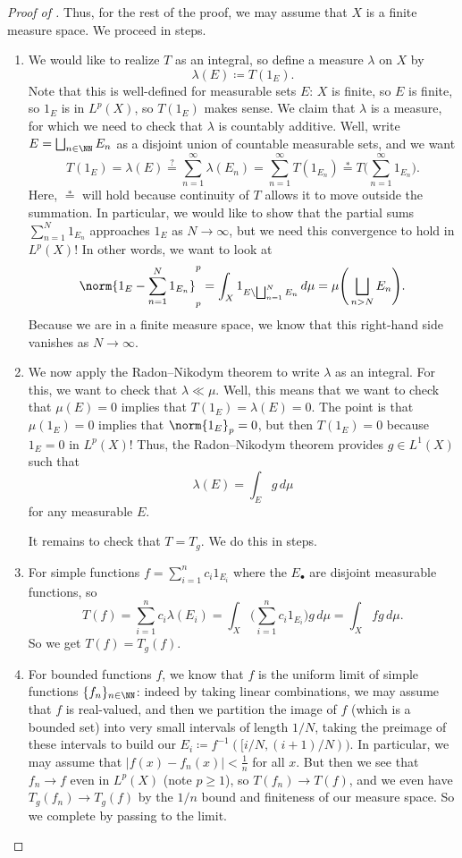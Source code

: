 \documentclass[../notes.tex]{subfiles}
\begin{document}
\begin{proof}[Proof of ]
	Thus, for the rest of the proof, we may assume that $X$ is a finite measure space. We proceed in steps.
	\begin{enumerate}
		\item We would like to realize $T$ as an integral, so define a measure $\lambda$ on $X$ by
		\[\lambda(E)\coloneqq T(1_E).\]
		Note that this is well-defined for measurable sets $E$: $X$ is finite, so $E$ is finite, so $1_E$ is in $L^p(X)$, so $T(1_E)$ makes sense. We claim that $\lambda$ is a measure, for which we need to check that $\lambda$ is countably additive. Well, write $E=\bigsqcup_{n\in\NN}E_n$ as a disjoint union of countable measurable sets, and we want
		\[T(1_E)=\lambda(E)\stackrel?=\sum_{n=1}^\infty\lambda(E_n)=\sum_{n=1}^\infty T(1_{E_n})\stackrel*=T\Bigg(\sum_{n=1}^\infty1_{E_n}\Bigg).\]
		Here, $\stackrel*=$ will hold because continuity of $T$ allows it to move outside the summation. In particular, we would like to show that the partial sums $\sum_{n=1}^N1_{E_n}$ approaches $1_E$ as $N\to\infty$, but we need this convergence to hold in $L^p(X)$! In other words, we want to look at
		\[\norm{1_E-\sum_{n=1}^N1_{E_n}}_p^p=\int_X1_{E\setminus\bigsqcup_{n=1}^NE_n}\,d\mu=\mu\Bigg(\bigsqcup_{n>N}E_n\Bigg).\]
		Because we are in a finite measure space, we know that this right-hand side vanishes as $N\to\infty$.

		\item We now apply the Radon--Nikodym theorem to write $\lambda$ as an integral. For this, we want to check that $\lambda\ll\mu$. Well, this means that we want to check that $\mu(E)=0$ implies that $T(1_E)=\lambda(E)=0$. The point is that $\mu(1_E)=0$ implies that $\norm{1_E}_p=0$, but then $T(1_E)=0$ because $1_E=0$ in $L^p(X)$! Thus, the Radon--Nikodym theorem provides $g\in L^1(X)$ such that
		\[\lambda(E)=\int_Eg\,d\mu\]
		for any measurable $E$.

		It remains to check that $T=T_g$. We do this in steps.

		\item For simple functions $f=\sum_{i=1}^nc_i1_{E_i}$ where the $E_\bullet$ are disjoint measurable functions, so
		\[T(f)=\sum_{i=1}^nc_i\lambda(E_i)=\int_X\Bigg(\sum_{i=1}^nc_i1_{E_i}\Bigg)g\,d\mu=\int_Xfg\,d\mu.\]
		So we get $T(f)=T_g(f)$.

		\item For bounded functions $f$, we know that $f$ is the uniform limit of simple functions $\{f_n\}_{n\in\NN}$: indeed by taking linear combinations, we may assume that $f$ is real-valued, and then we partition the image of $f$ (which is a bounded set) into very small intervals of length $1/N$, taking the preimage of these intervals to build our $E_i\coloneqq f^{-1}([i/N,(i+1)/N))$. In particular, we may assume that $\left|f(x)-f_n(x)\right|<\frac1n$ for all $x$. But then we see that $f_n\to f$ even in $L^p(X)$ (note $p\ge1$), so $T(f_n)\to T(f)$, and we even have $T_g(f_n)\to T_g(f)$ by the $1/n$ bound and finiteness of our measure space. So we complete by passing to the limit.


\end{enumerate}
\end{proof}
\end{document}
